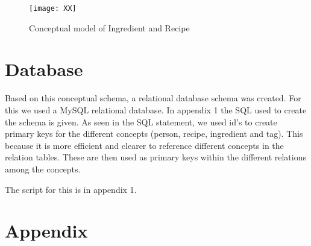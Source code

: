 \documentclass{article}
\begin{document}
\begin{figure}[H]
\centering
\texttt{[image: XX]}
\caption{Conceptual model of Ingredient and Recipe}
\end{figure}


\section{Database}
Based on this conceptual schema, a relational database schema was created. For this we used a MySQL relational database. In appendix 1 the SQL used to create the schema is given. As seen in the SQL statement, we used id's to create primary keys for the different concepts (person, recipe, ingredient and tag). This because it is more efficient and clearer to reference different concepts in the relation tables. These are then used as primary keys within the different relations among the concepts. 

The script for this is in appendix 1.

\section*{Appendix}
\end{document}
